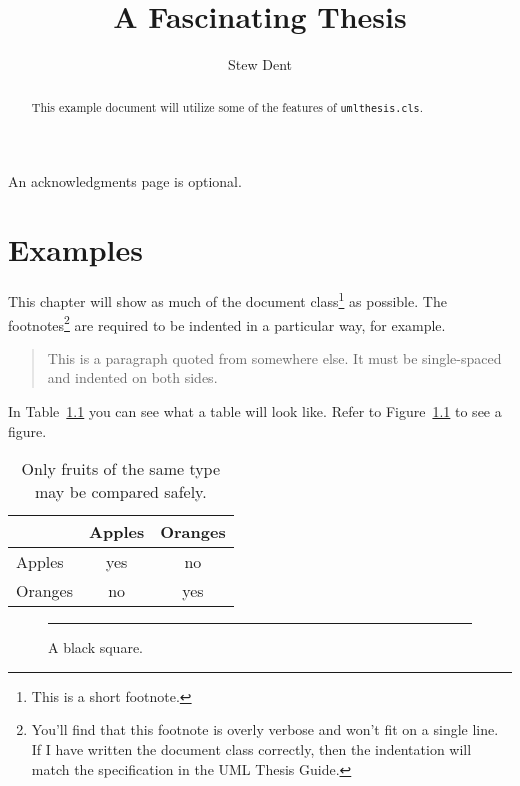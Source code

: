 \documentclass{umlthesis}
\title{A Fascinating Thesis}
\author{Stew Dent}
\begin{document}
\maketitle
\begin{abstract}
  This example document will utilize some of the features of \texttt{umlthesis.cls}.
\end{abstract}

\begin{acknowledgments}
An acknowledgments page is optional.
\end{acknowledgments}

\tableofcontents
\listoffigures
\listoftables

\chapter{Examples}
This chapter will show as much of the document class\footnote{This is a short footnote.} as possible. The footnotes\footnote{You'll find that this footnote is overly verbose and won't fit on a single line. If I have written the document class correctly, then the indentation will match the specification in the UML Thesis Guide.} are required to be indented in a particular way, for example.

\begin{quote}
  This is a paragraph quoted from somewhere else. It must be single-spaced and indented on both sides.
\end{quote}

In Table~\ref{tab:fruits} you can see what a table will look like. Refer to Figure~\ref{fig:square} to see a figure.

\begin{table}[h]
  \centering
  \caption[Comparison of fruits]{Only fruits of the same type may be compared safely.}
  \label{tab:fruits}
  \begin{tabular}{l|cc}
    & Apples & Oranges \\
    \hline
    Apples & yes & no \\
    Oranges & no & yes \\
  \end{tabular}
\end{table}

\lipsum[1]

\begin{figure}
  \centering
  \rule{2in}{2in}
  \caption{A black square.}
  \label{fig:square}
\end{figure}
\end{document}
